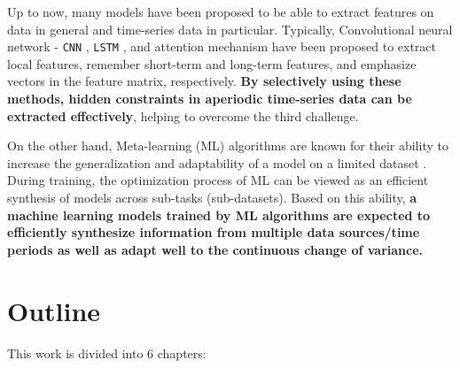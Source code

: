 Up to now, many models have been proposed to be able to extract features on data in general and time-series data in particular. Typically, Convolutional neural network - \verb|CNN| \cite{lecun1989handwritten}, \verb|LSTM| \cite{hochreiter1997long}, and attention mechanism \cite{bahdanau2014neural, luong2015effective, vaswani2017attention} have been proposed to extract local features, remember short-term and long-term features, and emphasize vectors in the feature matrix, respectively. \textbf{By selectively using these methods, hidden constraints in aperiodic time-series data can be extracted effectively}, helping to overcome the third challenge.


On the other hand, Meta-learning (ML) algorithms are known for their ability to increase the generalization and adaptability of a model on a limited dataset \cite{hospedales2021meta, vettoruzzo2024advances}. During training, the optimization process of ML can be viewed as an efficient synthesis of models across sub-tasks (sub-datasets). Based on this ability, \textbf{a machine learning models trained by ML algorithms are expected to efficiently synthesize information from multiple data sources/time periods as well as adapt well to the continuous change of variance.}

\section{Outline}

This work is divided into 6 chapters:

